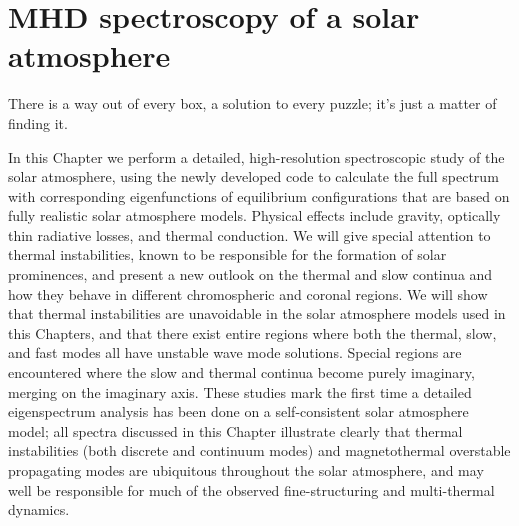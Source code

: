 \chapter{MHD spectroscopy of a solar atmosphere} \label{ch: solar_atmosphere}

\graphicspath{{06-solar_atmosphere/figures/}}

\begin{chapterquote}
  There is a way out of every box, a solution to every puzzle; it's just a matter of finding it.
\end{chapterquote}


In this Chapter we perform a detailed, high-resolution spectroscopic study of the solar atmosphere, using the newly developed {\legolas} code to calculate the full spectrum with corresponding eigenfunctions of equilibrium configurations that are based on fully realistic solar atmosphere models. Physical effects include gravity, optically thin radiative losses, and thermal conduction. We will give special attention to thermal instabilities, known to be responsible for the formation of solar prominences, and present a new outlook on the thermal and slow continua and how they behave in different chromospheric and coronal regions. We will show that thermal instabilities are unavoidable in the solar atmosphere models used in this Chapters, and that there exist entire regions where both the thermal, slow, and fast modes all have unstable wave mode solutions. Special regions are encountered where the slow and thermal continua become purely imaginary, merging on the imaginary axis. These studies mark the first time a detailed eigenspectrum analysis has been done on a self-consistent solar atmosphere model; all spectra discussed in this Chapter illustrate clearly that thermal instabilities (both discrete and continuum modes) and magnetothermal overstable propagating modes are ubiquitous throughout the solar atmosphere, and may well be responsible for much of the observed fine-structuring and multi-thermal dynamics.

